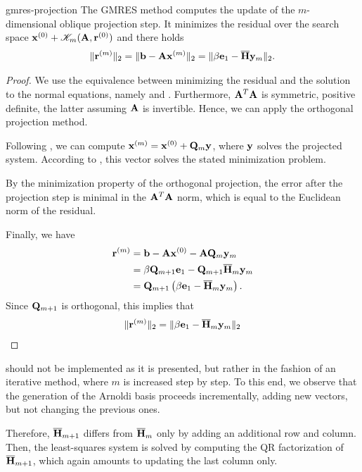 \begin{Theorem}{gmres-projection}
  The GMRES method computes the update of the $m$-dimensional oblique
  projection step. It minimizes the residual over the search space
  $\mathbf x^{(0)} +\mathscr K_m(\mathbf A,\mathbf r^{(0)})$ and there holds
  \begin{gather}
    \label{eq:gmres-norm}
    \lVert\mathbf r^{(m)}\rVert_2 = \lVert\mathbf b-\mathbf A\mathbf x^{(m)}\rVert_2 =
    \lVert\beta\mathbf e_1 - \overline{\mathbf H} \mathbf y_m\rVert_2.
  \end{gather}
\end{Theorem}

\begin{proof}
  We use the equivalence between minimizing the residual and the
  solution to the normal equations, namely
   and
  .  Furthermore, $\mathbf A^T\mathbf A$
  is symmetric, positive definite, the latter assuming $\mathbf A$ is
  invertible. Hence, we can apply the orthogonal projection method.

  Following , we can compute
  $\mathbf x^{(m)} = \mathbf x^{(0)} + \mathbf Q_m\mathbf y$, where $\mathbf y$ solves the
  projected system. According to ,
  this vector solves the stated minimization problem.
  
  By the minimization property of the orthogonal projection, the error
  after the projection step is minimal in the $\mathbf A^T\mathbf A$ norm,
  which is equal to the Euclidean norm of the residual.

  Finally, we have
  \begin{align}
    \mathbf r^{(m)}
    &= \mathbf b-\mathbf A\mathbf x^{(0)} - \mathbf A\mathbf Q_m\mathbf y_m\\
    &=\beta\mathbf Q_{m+1}\mathbf e_1 - \mathbf Q_{m+1}\overline{\mathbf H}_m\mathbf y_m\\
    &= \mathbf Q_{m+1}\left(\beta\mathbf e_1 - \overline{\mathbf H}_m\mathbf y_m\right).
  \end{align}
  Since $\mathbf Q_{m+1}$ is orthogonal, this implies that
  \begin{gather}
    \lVert\mathbf r^{(m)}\rVert_2 = \lVert\beta\mathbf e_1 - \overline{\mathbf H}_m\mathbf y_m\rVert_2
  \end{gather}
\end{proof}

\begin{remark}
   should not be implemented as it is
  presented, but rather in the fashion of an iterative method, where
  $m$ is increased step by step. To this end, we observe that the
  generation of the Arnoldi basis proceeds incrementally, adding new
  vectors, but not changing the previous ones.

  Therefore, $\overline{\mathbf H}_{m+1}$ differs from $\overline{\mathbf H}_{m}$
  only by adding an additional row and column. Then, the least-squares
  system is solved by computing the QR factorization of
  $\overline{\mathbf H}_{m+1}$, which again amounts to updating the last
  column only.
\end{remark}

